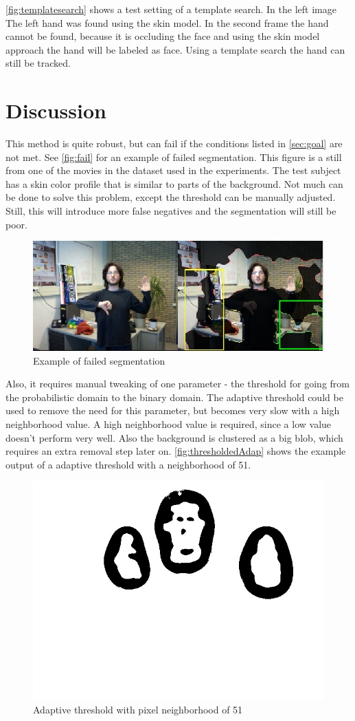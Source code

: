 \autoref{fig:templatesearch} shows a test setting of a template search. In the left image The left hand was found using the skin model. In the second frame the hand cannot be found, because it is occluding the face and using the skin model approach the hand will be labeled as face. Using a template search the hand can still be tracked.


\section{Discussion}
This method is quite robust, but can fail if the conditions listed in \autoref{sec:goal} are not met. See \autoref{fig:fail} for an example of failed segmentation. This figure is a still from one of the movies in the dataset used in the experiments. The test subject has a skin color profile that is similar to parts of the background. Not much can be done to solve this problem, except the threshold can be manually adjusted. Still, this will introduce more false negatives and the segmentation will still be poor.

\begin{figure}[htbp]
\center{}
\includegraphics[width=0.8\linewidth]{figures/fail.png}
\caption{Example of failed segmentation}
\label{fig:fail}
\end{figure}

Also, it requires manual tweaking of one parameter - the threshold for going from the probabilistic domain to the binary domain. The adaptive threshold could be used to remove the need for this parameter, but becomes very slow with a high neighborhood value. A high neighborhood value is required, since a low value doesn't perform very well. Also the background is clustered as a big blob, which requires an extra removal step later on. \autoref{fig:thresholdedAdap} shows the example output of a adaptive threshold with a neighborhood of 51.


\begin{figure}[htbp]
\center{}
\includegraphics[width=0.3\linewidth]{figures/pipeline/thresholdedAdap.jpg}
\caption{Adaptive threshold with pixel neighborhood of 51}
\label{fig:thresholdedAdap}
\end{figure}






